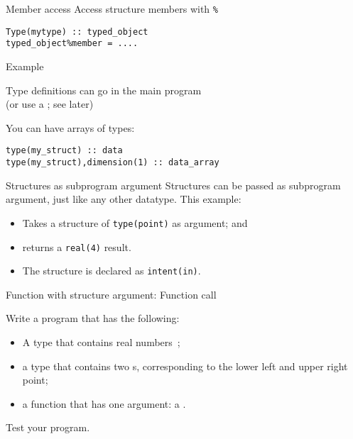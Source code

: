 \begin{block}{Member access}
  \label{sl:ftype-access}
  Access structure members with \verb+%+
\begin{lstlisting}
Type(mytype) :: typed_object
typed_object%member = ....  
\end{lstlisting}
\end{block}

\begin{block}{Example}
  \label{sl:ftype-ex}
  \begin{multicols}{2}
    \columnbreak
  \end{multicols}
  Type definitions can go in the main program\\
  (or use a ; see later)
\end{block}

You can have arrays of types:
\begin{lstlisting}
type(my_struct) :: data
type(my_struct),dimension(1) :: data_array
\end{lstlisting}

\begin{block}{Structures as subprogram argument}
  \label{sl:ftype-pass}
  Structures can be passed as subprogram argument, just like any other
  datatype. This example:
  \begin{itemize}
  \item Takes a structure of \lstinline{type(point)} as argument; and
  \item returns a \lstinline{real(4)} result.
  \item The structure is declared as \lstinline{intent(in)}.
  \end{itemize}

  \begin{multicols}{2}
    Function with structure argument:
    \columnbreak
    Function call
  \end{multicols}

\end{block}

\begin{exercise}
  \label{ex:ftype-rect}
  Write a program that has the following:
  \begin{itemize}
  \item A type  that contains real numbers~;
  \item a type  that contains two s,
    corresponding to the lower left and upper right point;
  \item a function  that has one argument: a .
  \end{itemize}
  Test your program.
\end{exercise}
